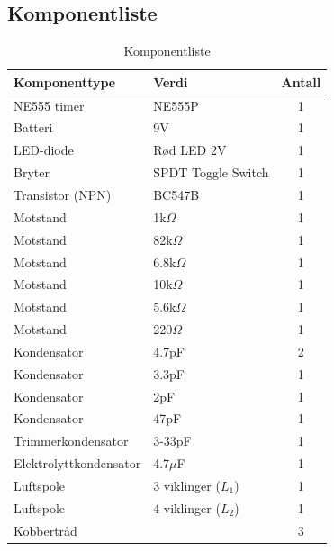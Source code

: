 \subsection{Komponentliste}
\begin{table}[H]
\centering
\caption{Komponentliste}
\vspace{1em}
\label{tab:komponentliste}
\begin{tabular}{|l|l|c|}
\hline
\rowcolor[gray]{0.9}
\textbf{Komponenttype} & \textbf{Verdi} & \textbf{Antall} \\ \hline
NE555 timer & NE555P & 1 \\ \hline
Batteri & 9V & 1 \\ \hline
LED-diode & Rød LED 2V & 1 \\ \hline
Bryter & SPDT Toggle Switch & 1 \\ \hline
Transistor (NPN) & BC547B & 1 \\ \hline
Motstand & 1k$\Omega$ & 1 \\ \hline
Motstand & 82k$\Omega$ & 1 \\ \hline
Motstand & 6.8k$\Omega$ & 1 \\ \hline
Motstand & 10k$\Omega$ & 1 \\ \hline
Motstand & 5.6k$\Omega$ & 1 \\ \hline
Motstand & 220$\Omega$ & 1 \\ \hline
Kondensator & 4.7pF & 2 \\ \hline
Kondensator & 3.3pF & 1 \\ \hline
Kondensator & 2pF & 1 \\ \hline
Kondensator & 47pF & 1 \\ \hline
Trimmerkondensator & 3-33pF & 1 \\ \hline
Elektrolyttkondensator & 4.7$\mu$F & 1 \\ \hline
Luftspole & 3 viklinger ($L_1$) & 1 \\ \hline
Luftspole & 4 viklinger ($L_2$) & 1 \\ \hline
Kobbertråd & & 3 \\ \hline
\end{tabular}
\end{table}


